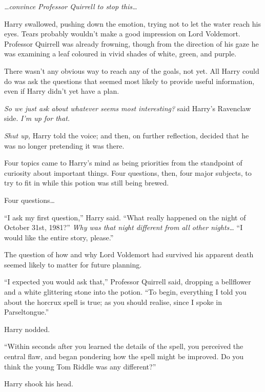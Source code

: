 \emph{…convince Professor Quirrell to \emph{stop this…}}

Harry swallowed, pushing down the emotion, trying not to let the water reach his eyes. Tears probably wouldn’t make a good impression on Lord Voldemort. Professor Quirrell was already frowning, though from the direction of his gaze he was examining a leaf coloured in vivid shades of white, green, and purple.

There wasn’t any obvious way to reach any of the goals, not yet. All Harry could do was ask the questions that seemed most likely to provide useful information, even if Harry didn’t yet have a plan.

\emph{So we just ask about whatever seems most interesting?} said Harry’s Ravenclaw side. \emph{I’m up for that.}

\emph{Shut up,} Harry told the voice; and then, on further reflection, decided that he was no longer pretending it was there.

Four topics came to Harry’s mind as being priorities from the standpoint of curiosity about important things. Four questions, then, four major subjects, to try to fit in while this potion was still being brewed.

Four questions…

“I ask my first question,” Harry said. “What really happened on the night of October 31st, 1981?” \emph{Why was that night different from all other nights…} “I would like the entire story, please.”

The question of how and why Lord Voldemort had survived his apparent death seemed likely to matter for future planning.

“I expected you would ask that,” Professor Quirrell said, dropping a bellflower and a white glittering stone into the potion. “To begin, everything I told you about the horcrux spell is true; as you should realise, since I spoke in Parseltongue.”

Harry nodded.

“Within seconds after you learned the details of the spell, you perceived the central flaw, and began pondering how the spell might be improved. Do you think the young Tom Riddle was any different?”

Harry shook his head.

